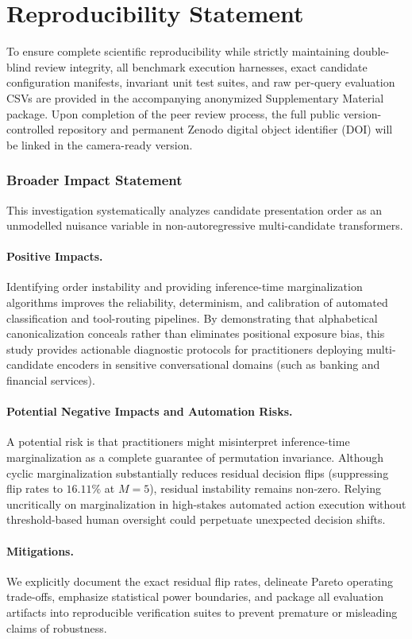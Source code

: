 \documentclass[10pt]{article}
\begin{document}
\section{Reproducibility Statement}

To ensure complete scientific reproducibility while strictly maintaining double-blind review integrity, all benchmark execution harnesses, exact candidate configuration manifests, invariant unit test suites, and raw per-query evaluation CSVs are provided in the accompanying anonymized Supplementary Material package. Upon completion of the peer review process, the full public version-controlled repository and permanent Zenodo digital object identifier (DOI) will be linked in the camera-ready version.

\subsubsection*{Broader Impact Statement}

This investigation systematically analyzes candidate presentation order as an unmodelled nuisance variable in non-autoregressive multi-candidate transformers.
\paragraph{Positive Impacts.} Identifying order instability and providing inference-time marginalization algorithms improves the reliability, determinism, and calibration of automated classification and tool-routing pipelines. By demonstrating that alphabetical canonicalization conceals rather than eliminates positional exposure bias, this study provides actionable diagnostic protocols for practitioners deploying multi-candidate encoders in sensitive conversational domains (such as banking and financial services).
\paragraph{Potential Negative Impacts and Automation Risks.} A potential risk is that practitioners might misinterpret inference-time marginalization as a complete guarantee of permutation invariance. Although cyclic marginalization substantially reduces residual decision flips (suppressing flip rates to $16.11\%$ at $M=5$), residual instability remains non-zero. Relying uncritically on marginalization in high-stakes automated action execution without threshold-based human oversight could perpetuate unexpected decision shifts.
\paragraph{Mitigations.} We explicitly document the exact residual flip rates, delineate Pareto operating trade-offs, emphasize statistical power boundaries, and package all evaluation artifacts into reproducible verification suites to prevent premature or misleading claims of robustness.
\end{document}
